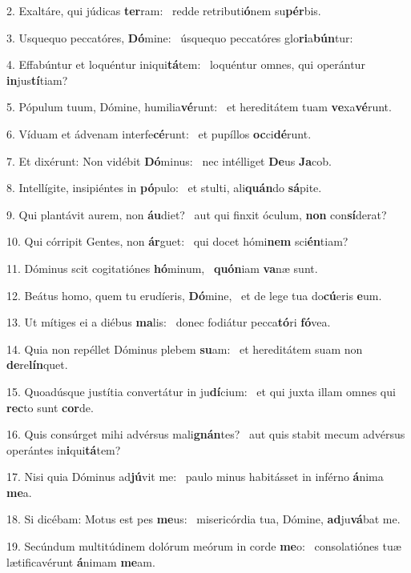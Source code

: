2. Exaltáre, qui júdicas \textbf{ter}ram: \ast\  redde retributi\textbf{ó}nem su\textbf{pér}bis.\

3. Usquequo peccatóres, \textbf{Dó}mine: \ast\  úsquequo peccatóres glo\textbf{ri}a\textbf{bún}tur:\

4. Effabúntur et loquéntur iniqui\textbf{tá}tem: \ast\  loquéntur omnes, qui operántur \textbf{in}jus\textbf{tí}tiam?\

5. Pópulum tuum, Dómine, humilia\textbf{vé}runt: \ast\  et hereditátem tuam \textbf{ve}xa\textbf{vé}runt.\

6. Víduam et ádvenam interfe\textbf{cé}runt: \ast\  et pupíllos \textbf{oc}ci\textbf{dé}runt.\

7. Et dixérunt: Non vidébit \textbf{Dó}minus: \ast\  nec intélliget \textbf{De}us \textbf{Ja}cob.\

8. Intellígite, insipiéntes in \textbf{pó}pulo: \ast\  et stulti, ali\textbf{quán}do \textbf{sá}pite.\

9. Qui plantávit aurem, non \textbf{áu}diet? \ast\  aut qui finxit óculum, \textbf{non} con\textbf{sí}derat?\

10. Qui córripit Gentes, non \textbf{ár}guet: \ast\  qui docet hómi\textbf{nem} sci\textbf{én}tiam?\

11. Dóminus scit cogitatiónes \textbf{hó}minum, \ast\  \textbf{quón}iam \textbf{va}næ sunt.\

12. Beátus homo, quem tu erudíeris, \textbf{Dó}mine, \ast\  et de lege tua do\textbf{cú}eris \textbf{e}um.\

13. Ut mítiges ei a diébus \textbf{ma}lis: \ast\  donec fodiátur pecca\textbf{tó}ri \textbf{fó}vea.\

14. Quia non repéllet Dóminus plebem \textbf{su}am: \ast\  et hereditátem suam non \textbf{de}re\textbf{lín}quet.\

15. Quoadúsque justítia convertátur in ju\textbf{dí}cium: \ast\  et qui juxta illam omnes qui \textbf{rec}to sunt \textbf{cor}de.\

16. Quis consúrget mihi advérsus mali\textbf{gnán}tes? \ast\  aut quis stabit mecum advérsus operántes in\textbf{i}qui\textbf{tá}tem?\

17. Nisi quia Dóminus ad\textbf{jú}vit me: \ast\  paulo minus habitásset in inférno \textbf{á}nima \textbf{me}a.\

18. Si dicébam: Motus est pes \textbf{me}us: \ast\  misericórdia tua, Dómine, \textbf{ad}ju\textbf{vá}bat me.\

19. Secúndum multitúdinem dolórum meórum in corde \textbf{me}o: \ast\  consolatiónes tuæ lætificavérunt \textbf{á}nimam \textbf{me}am.\

